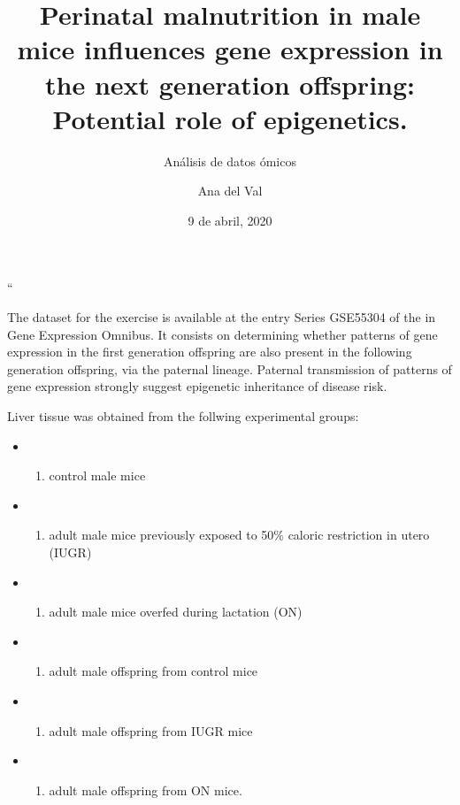 \documentclass[]{article}
\title{Perinatal malnutrition in male mice influences gene expression in the
next generation offspring: Potential role of epigenetics.}
\subtitle{Análisis de datos ómicos}
\author{Ana del Val}
\date{9 de abril, 2020}
\providecommand{\tightlist}{%
  \setlength{\itemsep}{0pt}\setlength{\parskip}{0pt}}
\begin{document}
\maketitle

{
\setcounter{tocdepth}{3}
\tableofcontents
}
``

The dataset for the exercise is available at the entry Series GSE55304
of the in Gene Expression Omnibus. It consists on determining whether
patterns of gene expression in the first generation offspring are also
present in the following generation offspring, via the paternal lineage.
Paternal transmission of patterns of gene expression strongly suggest
epigenetic inheritance of disease risk.

Liver tissue was obtained from the follwing experimental groups:

\begin{itemize}
\item
  \begin{enumerate}
  \def\labelenumi{\alph{enumi})}
  \tightlist
  \item
    control male mice
  \end{enumerate}
\item
  \begin{enumerate}
  \def\labelenumi{\alph{enumi})}
  \setcounter{enumi}{1}
  \tightlist
  \item
    adult male mice previously exposed to 50\% caloric restriction in
    utero (IUGR)
  \end{enumerate}
\item
  \begin{enumerate}
  \def\labelenumi{\alph{enumi})}
  \setcounter{enumi}{2}
  \tightlist
  \item
    adult male mice overfed during lactation (ON)
  \end{enumerate}
\item
  \begin{enumerate}
  \def\labelenumi{\alph{enumi})}
  \setcounter{enumi}{3}
  \tightlist
  \item
    adult male offspring from control mice
  \end{enumerate}
\item
  \begin{enumerate}
  \def\labelenumi{\alph{enumi})}
  \setcounter{enumi}{4}
  \tightlist
  \item
    adult male offspring from IUGR mice
  \end{enumerate}
\item
  \begin{enumerate}
  \def\labelenumi{\alph{enumi})}
  \setcounter{enumi}{5}
  \tightlist
  \item
    adult male offspring from ON mice.
  \end{enumerate}
\end{itemize}
\end{document}

